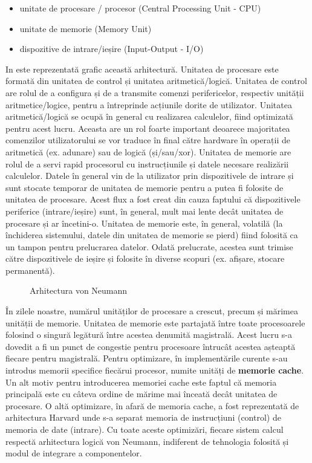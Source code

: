 \begin{itemize}
  \item unitate de procesare / procesor (Central Processing Unit - CPU)
  \item unitate de memorie (Memory Unit) 
  \item dispozitive de intrare/ieșire (Input-Output - I/O)
\end{itemize}

In  este reprezentată grafic această
arhitectură. Unitatea de procesare este formată din unitatea de control și
unitatea aritmetică/logică. Unitatea de control are rolul de a configura și de a transmite
comenzi perifericelor, respectiv unității aritmetice/logice, pentru a
întreprinde acțiunile dorite de utilizator. Unitatea aritmetică/logică se ocupă
în general cu realizarea calculelor, fiind optimizată pentru acest lucru.
Aceasta are un rol foarte important deoarece majoritatea comenzilor
utilizatorului se vor traduce în final către hardware în operații de aritmetică
(ex. adunare) sau de logică (și/sau/xor). Unitatea de memorie are rolul de a
servi rapid procesorul cu instrucțiunile și datele necesare realizării calculelor. Datele în
general vin de la utilizator prin dispozitivele de intrare și sunt stocate
temporar de unitatea de memorie pentru a putea fi folosite de unitatea de
procesare. Acest flux a fost creat din cauza faptului că dispozitivele
periferice (intrare/ieșire) sunt, în general, mult mai lente decât unitatea de
procesare și ar încetini-o. Unitatea de memorie este, în general, volatilă (la
închiderea sistemului, datele din unitatea de memorie se pierd) fiind folosită
ca un tampon pentru prelucrarea datelor. Odată prelucrate, acestea sunt trimise
către dispozitivele de ieșire și folosite în diverse scopuri (ex. afișare, stocare
permanentă).

\begin{figure}[!htbp]
  \centering
  \def\svgwidth{0.8\columnwidth}
  
  \caption{Arhitectura von Neumann}
  \label{fig:hw:von-neumann}
\end{figure}

În zilele noastre, numărul unităților de procesare a crescut, precum și mărimea
unității de memorie. Unitatea de memorie este partajată între toate
procesoarele folosind o singură legătură între acestea denumită magistrală.
Acest lucru s-a dovedit a fi un punct de congestie pentru procesoare întrucât
acestea așteaptă fiecare pentru magistrală. Pentru optimizare, în implementările
curente s-au introdus memorii specifice fiecărui procesor, numite unități de \textbf{memorie cache}. Un alt
motiv pentru introducerea memoriei cache este faptul că memoria
principală este cu câteva ordine de mărime mai înceată decât unitatea de
procesare. O altă optimizare, în afară de memoria cache, a fost reprezentată de
arhitectura Harvard unde s-a separat memoria de instrucțiuni (control) de
memoria de date (intrare). Cu toate aceste optimizări, fiecare sistem calcul
respectă arhitectura logică von Neumann, indiferent de tehnologia folosită și
modul de integrare a componentelor.

